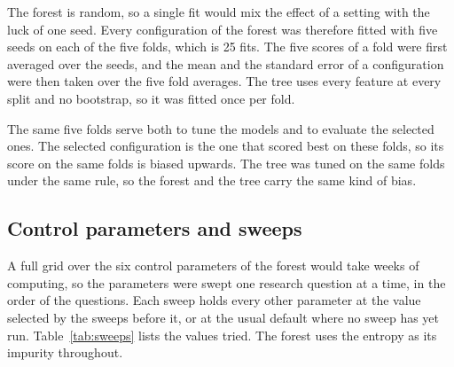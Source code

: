 \documentclass[conference,10pt]{IEEEtran}
\begin{document}
The forest is random, so a single fit would mix the effect of a setting
with the luck of one seed. Every configuration of the forest was therefore
fitted with five seeds on each of the five folds, which is 25 fits. The
five scores of a fold were first averaged over the seeds, and the mean and
the standard error of a configuration were then taken over the five fold
averages. The tree uses every feature at every split and no bootstrap, so
it was fitted once per fold.

The same five folds serve both to tune the models and to evaluate the
selected ones. The selected configuration is the one that scored best on
these folds, so its score on the same folds is biased upwards. The tree was
tuned on the same folds under the same rule, so the forest and the tree
carry the same kind of bias.

\subsection{Control parameters and sweeps}
\label{subsec:emp_sweeps}

A full grid over the six control parameters of the forest would take weeks
of computing, so the parameters were swept one research question at a time,
in the order of the questions. Each sweep holds every other parameter at the
value selected by the sweeps before it, or at the usual default where no
sweep has yet run. Table~\ref{tab:sweeps} lists the values tried. The forest
uses the entropy as its impurity throughout.
\end{document}
